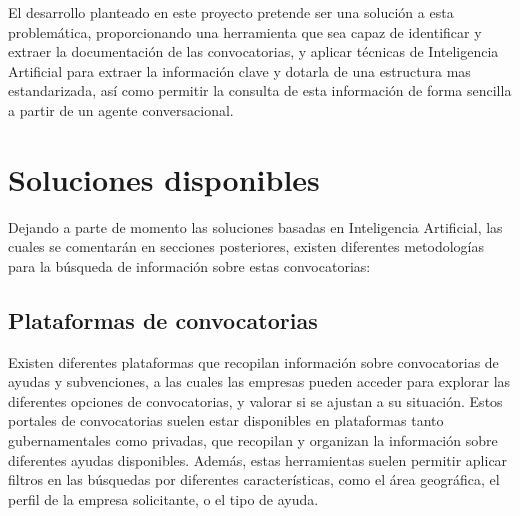 El desarrollo planteado en este proyecto pretende ser una solución a esta problemática, proporcionando una herramienta que sea capaz de identificar y extraer la documentación de las convocatorias, y aplicar técnicas de Inteligencia Artificial para extraer la información clave y dotarla de una estructura mas estandarizada, así como permitir la consulta de esta información de forma sencilla a partir de un agente conversacional.


\section{Soluciones disponibles}

Dejando a parte de momento las soluciones basadas en Inteligencia Artificial, las cuales se comentarán en secciones posteriores, existen diferentes metodologías para la búsqueda de información sobre estas convocatorias:

\subsection{Plataformas de convocatorias}

Existen diferentes plataformas que recopilan información sobre convocatorias de ayudas y subvenciones, a las cuales las empresas pueden acceder para explorar las diferentes opciones de convocatorias, y valorar si se ajustan a su situación.
Estos portales de convocatorias suelen estar disponibles en plataformas tanto gubernamentales como privadas, que recopilan y organizan la información sobre diferentes ayudas disponibles. 
Además, estas herramientas suelen permitir aplicar filtros en las búsquedas por diferentes características, como el área geográfica, el perfil de la empresa solicitante, o el tipo de ayuda.

